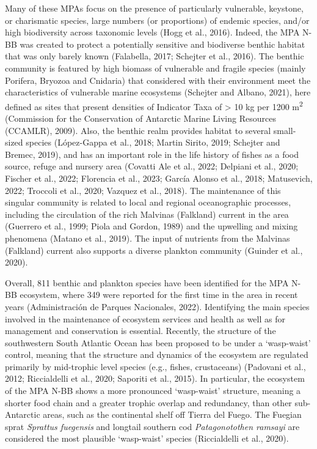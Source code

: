 \documentclass[preprint, 3p,
authoryear]{elsarticle} %
\begin{document}
Many of these MPAs focus on the presence of particularly vulnerable,
keystone, or charismatic species, large numbers (or proportions) of
endemic species, and/or high biodiversity across taxonomic levels (Hogg
et al., 2016). Indeed, the MPA N-BB was created to protect a potentially
sensitive and biodiverse benthic habitat that was only barely known
(Falabella, 2017; Schejter et al., 2016). The benthic community is
featured by high biomass of vulnerable and fragile species (mainly
Porifera, Bryozoa and Cnidaria) that considered with their environment
meet the characteristics of vulnerable marine ecosystems (Schejter and
Albano, 2021), here defined as sites that present densities of Indicator
Taxa of \textgreater{} 10 kg per 1200 m\textsuperscript{2} (Commission
for the Conservation of Antarctic Marine Living Resources (CCAMLR),
2009). Also, the benthic realm provides habitat to several small-sized
species (López-Gappa et al., 2018; Martin Sirito, 2019; Schejter and
Bremec, 2019), and has an important role in the life history of fishes
as a food source, refuge and nursery area (Covatti Ale et al., 2022;
Delpiani et al., 2020; Fischer et al., 2022; Florencia et al., 2023;
García Alonso et al., 2018; Matusevich, 2022; Troccoli et al., 2020;
Vazquez et al., 2018). The maintenance of this singular community is
related to local and regional oceanographic processes, including the
circulation of the rich Malvinas (Falkland) current in the area
(Guerrero et al., 1999; Piola and Gordon, 1989) and the upwelling and
mixing phenomena (Matano et al., 2019). The input of nutrients from the
Malvinas (Falkland) current also supports a diverse plankton community
(Guinder et al., 2020).

Overall, 811 benthic and plankton species have been identified for the
MPA N-BB ecosystem, where 349 were reported for the first time in the
area in recent years (Administración de Parques Nacionales, 2022).
Identifying the main species involved in the maintenance of ecosystem
services and health as well as for management and conservation is
essential. Recently, the structure of the southwestern South Atlantic
Ocean has been proposed to be under a `wasp-waist' control, meaning that
the structure and dynamics of the ecosystem are regulated primarily by
mid-trophic level species (e.g., fishes, crustaceans) (Padovani et al.,
2012; Riccialdelli et al., 2020; Saporiti et al., 2015). In particular,
the ecosystem of the MPA N-BB shows a more pronounced `wasp-waist'
structure, meaning a shorter food chain and a greater trophic overlap
and redundancy, than other sub-Antarctic areas, such as the continental
shelf off Tierra del Fuego. The Fuegian sprat \emph{Sprattus fuegensis}
and longtail southern cod \emph{Patagonotothen ramsayi} are considered
the most plausible `wasp-waist' species (Riccialdelli et al., 2020).
\end{document}
